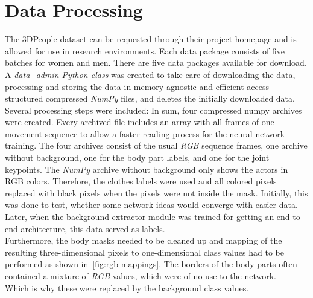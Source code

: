 \section{Data Processing}
The 3DPeople dataset can be requested through their project homepage and is allowed for use in research
environments.
Each data package consists of five batches for women and men. There are five data packages available for download.
A \textit{data\_admin Python class} was created to take care of downloading the data, processing and storing the
data
in memory agnostic and efficient access structured compressed \textit{NumPy} files, and deletes the initially downloaded data.\\
Several processing steps were included:
In sum, four compressed numpy archives were created.
Every archived file includes an array with all frames of one movement sequence to allow a faster reading process for
the neural network training.
The four archives consist of the usual \textit{RGB} sequence frames, one archive without background, one for the body part
labels,
and one for the joint keypoints.
The \textit{NumPy} archive without background only shows the actors in RGB colors.
Therefore, the clothes labels were used and all colored pixels replaced with black pixels when the pixels were not
inside the mask.
Initially, this was done to test, whether some network ideas would converge with easier data.
Later, when the background-extractor module was trained for getting an end-to-end architecture, this data served as
labels.\\
Furthermore, the body masks needed to be cleaned up and mapping of the resulting three-dimensional pixels to one-dimensional class
values had to be performed as shown in~\autoref{fig:rgb-mappings}.
The borders of the body-parts often contained a mixture of \textit{RGB} values, which were of no use to the network.\\
Which is why these were replaced by the background class values.
